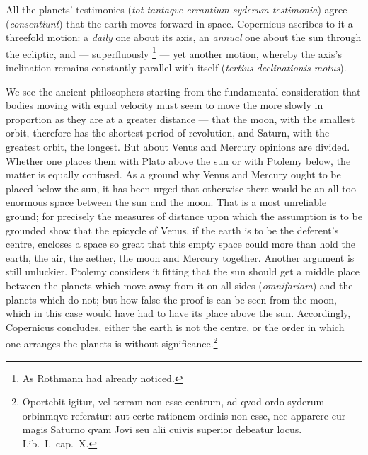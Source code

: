 \documentclass[12pt,a4paper]{book}
\renewcommand{\thefootnote}{*)}
\begin{document}
All the planets' testimonies (\textit{tot tantaqve errantium syderum testimonia}) agree
(\textit{consentiunt}) that the earth moves forward in space. Copernicus ascribes to it a threefold
motion: a \emph{daily} one about its axis, an \emph{annual} one about the sun through the ecliptic,
and --- superfluously%
\renewcommand{\thefootnote}{**)}%
\footnote{%
As Rothmann had already noticed.}%
\renewcommand{\thefootnote}{*)}
--- yet another motion, whereby the axis's inclination remains constantly parallel
with itself (\textit{tertius declinationis motus}).

We see the ancient philosophers starting from the fundamental consideration that bodies moving with
equal velocity must seem to move the more slowly in proportion as they are at a greater distance ---
that the moon, with the smallest orbit, therefore has the shortest period of revolution, and Saturn,
with the greatest orbit, the longest. But about Venus and Mercury opinions are divided. Whether one
places them with Plato above the sun or with Ptolemy below, the matter is equally
confused. As a ground why Venus and Mercury ought to be placed below the sun, it has been urged that
otherwise there would be an all too enormous space between the sun and the moon. That is a most
unreliable ground; for precisely the measures of distance upon which the assumption is to be
grounded show that the epicycle of Venus, if the earth is to be the deferent's centre, encloses a
space so great that this empty space could more than hold the earth, the air, the aether, the moon
and Mercury together. Another argument is still unluckier. Ptolemy considers it fitting that the sun
should get a middle place between the planets which move away from it on all sides
(\textit{omnifariam}) and the planets which do not; but how false the proof is can be seen from the
moon, which in this case would have had to have its place above the sun. Accordingly, Copernicus
concludes, either the earth is not the centre, or the order in which one arranges the planets is
without significance.\footnote{%
Oportebit igitur, vel terram non esse centrum, ad qvod ordo syderum orbinmqve referatur: aut certe
rationem ordinis non esse, nec apparere cur magis Saturno qvam Jovi seu alii cuivis superior debeatur
locus. Lib.\ I.\ cap.\ X.}
\end{document}
